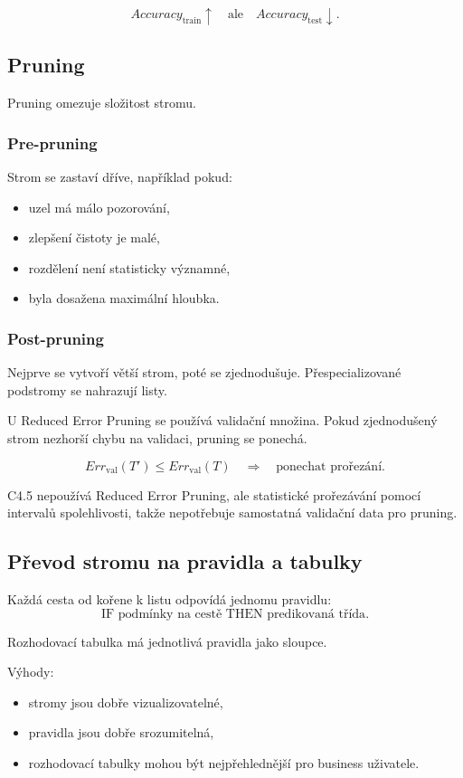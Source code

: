 \[
Accuracy_{\text{train}} \uparrow
\quad
\text{ale}
\quad
Accuracy_{\text{test}} \downarrow.
\]

\subsection{Pruning}

Pruning omezuje složitost stromu.

\subsubsection{Pre-pruning}

Strom se zastaví dříve, například pokud:
\begin{itemize}
    \item uzel má málo pozorování,
    \item zlepšení čistoty je malé,
    \item rozdělení není statisticky významné,
    \item byla dosažena maximální hloubka.
\end{itemize}

\subsubsection{Post-pruning}

Nejprve se vytvoří větší strom, poté se zjednodušuje. Přespecializované podstromy se nahrazují listy.

U Reduced Error Pruning se používá validační množina. Pokud zjednodušený strom nezhorší chybu na validaci,
pruning se ponechá.

\[
Err_{\text{val}}(T')
\leq
Err_{\text{val}}(T)
\quad
\Rightarrow
\quad
\text{ponechat prořezání}.
\]

C4.5 nepoužívá Reduced Error Pruning, ale statistické prořezávání pomocí intervalů spolehlivosti, takže
nepotřebuje samostatná validační data pro pruning.

\subsection{Převod stromu na pravidla a tabulky}

Každá cesta od kořene k listu odpovídá jednomu pravidlu:
\[
\text{IF podmínky na cestě THEN predikovaná třída}.
\]

Rozhodovací tabulka má jednotlivá pravidla jako sloupce.

Výhody:
\begin{itemize}
    \item stromy jsou dobře vizualizovatelné,
    \item pravidla jsou dobře srozumitelná,
    \item rozhodovací tabulky mohou být nejpřehlednější pro business uživatele.
\end{itemize}

